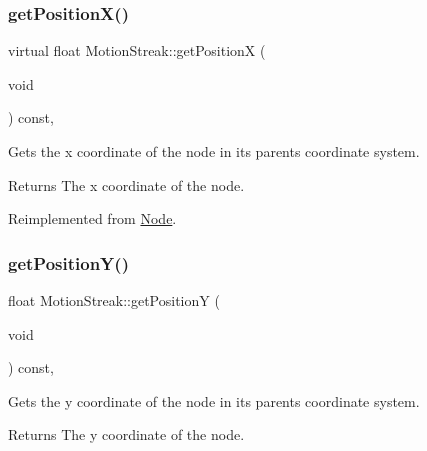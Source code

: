 \mbox{\label{classMotionStreak_a21adf0bcf7c0713e1e0b0b00c5256a37}} 
\subsubsection{\texorpdfstring{get\+Position\+X()}{getPositionX()}\hspace{0.1cm}{\footnotesize\ttfamily [2/2]}}
{\footnotesize\ttfamily virtual float Motion\+Streak\+::get\+PositionX (\begin{DoxyParamCaption}\item[{void}]{ }\end{DoxyParamCaption}) const\hspace{0.3cm}{\ttfamily [override]}, {\ttfamily [virtual]}}

Gets the x coordinate of the node in its parent\textquotesingle{}s coordinate system.

\begin{DoxyReturn}{Returns}
The x coordinate of the node. 
\end{DoxyReturn}


Reimplemented from \hyperlink{classNode_ad4b27cd8bc98960789fbd2b574666a25}{Node}.

\mbox{\label{classMotionStreak_a4138d128c57dad6a41f8d51bbf13a0f8}} 
\subsubsection{\texorpdfstring{get\+Position\+Y()}{getPositionY()}\hspace{0.1cm}{\footnotesize\ttfamily [1/2]}}
{\footnotesize\ttfamily float Motion\+Streak\+::get\+PositionY (\begin{DoxyParamCaption}\item[{void}]{ }\end{DoxyParamCaption}) const\hspace{0.3cm}{\ttfamily [override]}, {\ttfamily [virtual]}}

Gets the y coordinate of the node in its parent\textquotesingle{}s coordinate system.

\begin{DoxyReturn}{Returns}
The y coordinate of the node. 
\end{DoxyReturn}


